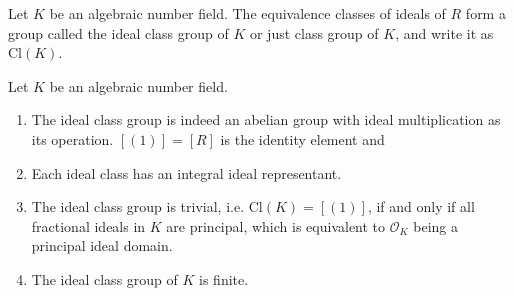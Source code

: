 \begin{defbox}
    \begin{definition}
        Let \(K\) be an algebraic number field. The equivalence classes of ideals of \(R\) form a group called the ideal class group of \(K\) or just class group of \(K\), and write it as \(\mathrm{Cl}(K)\).
    \end{definition}
\end{defbox}

\begin{thmbox}
    \begin{theorem}
        Let \(K\) be an algebraic number field.
        \begin{enumerate}
            \item The ideal class group is indeed an abelian group with ideal multiplication as its operation. \([(1)] = [R]\) is the identity element and 
            \item Each ideal class has an integral ideal representant.
            \item The ideal class group is trivial, i.e. \(\mathrm{Cl}(K) = [(1)]\), if and only if all fractional ideals in \(K\) are principal, which is equivalent to \(\mathcal{O}_K\) being a principal ideal domain.
            \item The ideal class group of \(K\) is finite.
        \end{enumerate}
    \end{theorem}
\end{thmbox}

